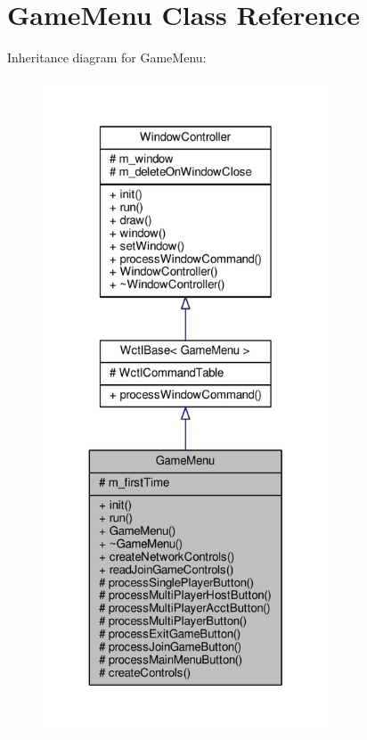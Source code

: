 \hypertarget{classGameMenu}{}\section{Game\+Menu Class Reference}
\label{classGameMenu}


Inheritance diagram for Game\+Menu\+:
\nopagebreak
\begin{figure}[H]
\begin{center}
\leavevmode
\includegraphics[height=550pt]{d2/d9c/classGameMenu__inherit__graph}
\end{center}
\end{figure}


